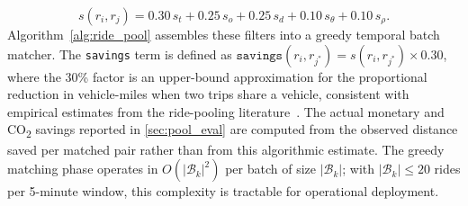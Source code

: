 \begin{equation}
 s(r_i, r_j) = 0.30\,s_t + 0.25\,s_o + 0.25\,s_d + 0.10\,s_\theta + 0.10\,s_\rho.
 \label{eq:compat}
\end{equation}
Algorithm~\ref{alg:ride_pool} assembles these filters into a greedy temporal batch matcher. The \texttt{savings} term is defined as $\texttt{savings}(r_i, r_{j^*}) = s(r_i, r_{j^*}) \times 0.30$, where the 30\% factor is an upper-bound approximation for the proportional reduction in vehicle-miles when two trips share a vehicle, consistent with empirical estimates from the ride-pooling literature~\parencite{santi2014quantifying}. The actual monetary and CO\textsubscript{2} savings reported in \autoref{sec:pool_eval} are computed from the observed distance saved per matched pair rather than from this algorithmic estimate. The greedy matching phase operates in $O(|\mathcal{B}_k|^2)$ per batch of size $|\mathcal{B}_k|$; with $|\mathcal{B}_k|\leq 20$ rides per 5-minute window, this complexity is tractable for operational deployment.

